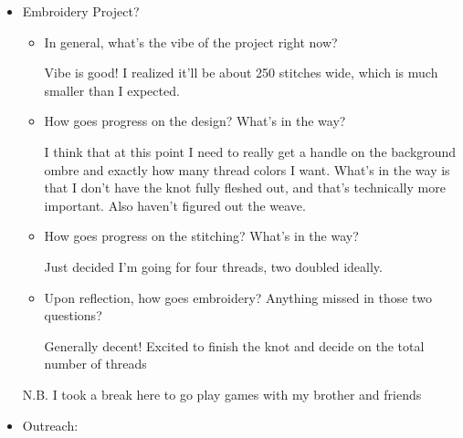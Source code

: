 \documentclass[12pt]{article}
\renewcommand{\,}{\textsuperscript{,}}
\begin{document}
\begin{itemize}
\begin{itemize}
\begin{itemize}
\item How goes listening?

Listened to half of album club for the week! These past few weeks have been in a bit of a music slump. Not much has seemed nice lately. Still need to listen to the mix tape and the playlist my partner made me.\footnote{keep wanting to write beloved, but iirc that name has been taken in this blog}

\item Upon reflection, how goes music? Anything missed in those four questions?

Could be much better, but now that I'm aware of it I can do better.

\end{itemize}

\item Embroidery Project?

\begin{itemize}

\item In general, what's the vibe of the project right now?

Vibe is good! I realized it'll be about 250 stitches wide, which is much smaller than I expected.

\item How goes progress on the design? What's in the way?

I think that at this point I need to really get a handle on the background ombre and exactly how many thread colors I want.  
What's in the way is that I don't have the knot fully fleshed out, and that's technically more important.  
Also haven't figured out the weave.

\item How goes progress on the stitching? What's in the way?

Just decided I'm going for four threads, two doubled ideally.

\item Upon reflection, how goes embroidery? Anything missed in those two questions?

Generally decent! Excited to finish the knot and decide on the total number of threads

\end{itemize}

N.B. I took a break here to go play games with my brother and friends

\item Outreach:

\begin{itemize}


\end{itemize}
\end{itemize}
\end{itemize}
\end{document}
